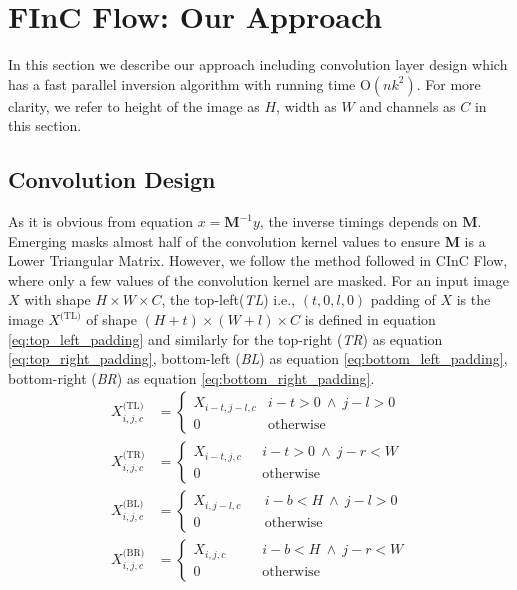 \documentclass[a4paper,twoside]{article}
\theoremstyle{definition}
\begin{document}
\section{FInC Flow: Our Approach}
In this section we describe our approach including convolution layer design which has a fast parallel inversion algorithm with running time O$(n k^2)$. For more clarity, we refer to height of the image as $H$, width as $W$ and channels as $C$ in this section.


\subsection{Convolution Design} \label{sec:conv-design}
As it is obvious from equation $ x = \textbf{M}^{-1} y$, the inverse timings depends on $\mathbf{M}$. Emerging \citep{behrmann2019invertible} masks almost half of the convolution kernel values to ensure $\textbf{M}$ is a Lower Triangular Matrix. However, we follow the method followed in CInC Flow, where only a few values of the convolution kernel are masked.
For an input image $X$ with shape $H \times W \times C$, the top-left(\emph{TL}) i.e., $(t, 0, l, 0)$ padding of $X$ is the image $X^{\text{(TL)}}$ of shape $(H+t) \times (W+l) \times C$ is defined in equation \ref{eq:top_left_padding} and similarly for the top-right (\emph{TR}) as equation \ref{eq:top_right_padding}, bottom-left (\emph{BL}) as equation \ref{eq:bottom_left_padding}, bottom-right (\emph{BR}) as equation \ref{eq:bottom_right_padding}. 
\begin{align}
    X^{\text{(TL)}}_{i, j, c} &= 
    \begin{cases}
        X_{i-t, j-l, c} & i - t > 0 ~\wedge~ 
        j - l > 0 \\
        0 &\text{otherwise}
    \end{cases} \label{eq:top_left_padding} \\
    X^{\text{(TR)}}_{i, j, c} &= 
    \begin{cases}
        X_{i-t, j, c}~~~ &  i - t > 0 ~\wedge~ j - r < W \\
        0 &\text{otherwise}
    \end{cases} \label{eq:top_right_padding} \\
    X^{\text{(BL)}}_{i, j, c} &= 
    \begin{cases}
        X_{i, j-l, c}~~~~ &  i - b < H ~\wedge~ j - l > 0 \\
        0 &\text{otherwise}
    \end{cases} \label{eq:bottom_left_padding}\\
    X^{\text{(BR)}}_{i, j, c} &= 
    \begin{cases}
        X_{i, j, c}~~~~~~~~ &  i - b < H ~\wedge~ j - r < W \\
        0 &\text{otherwise}
    \end{cases}  \label{eq:bottom_right_padding}
\end{align}
\end{document}
